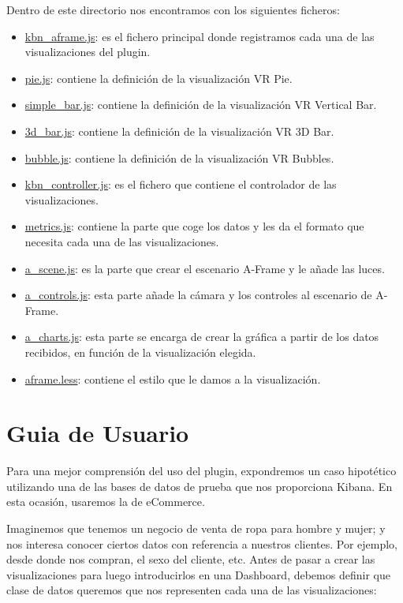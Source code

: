 \documentclass[a4paper, 12pt]{book}
\begin{document}
Dentro de este directorio nos encontramos con los siguientes ficheros:

\begin{itemize}
    \item \underline{kbn\_aframe.js}: es el fichero principal donde registramos cada una de las visualizaciones del plugin.
    \item \underline{pie.js}: contiene la definición de la visualización VR Pie.
    \item \underline{simple\_bar.js}: contiene la definición de la visualización VR Vertical Bar.
    \item \underline{3d\_bar.js}: contiene la definición de la visualización VR 3D Bar.
    \item \underline{bubble.js}: contiene la definición de la visualización VR Bubbles.
    \item \underline{kbn\_controller.js}: es el fichero que contiene el controlador de las visualizaciones.
    \item \underline{metrics.js}: contiene la parte que coge los datos y les da el formato que necesita cada una de las visualizaciones.
    \item \underline{a\_scene.js}: es la parte que crear el escenario A-Frame y le añade las luces.
    \item \underline{a\_controls.js}: esta parte añade la cámara y los controles al escenario de A-Frame.
    \item \underline{a\_charts.js}: esta parte se encarga de crear la gráfica a partir de los datos recibidos, en función de la visualización elegida.
    \item \underline{aframe.less}: contiene el estilo que le damos a la visualización.
\end{itemize}

\section{Guia de Usuario}
\label{sec:guiausuario}

Para una mejor comprensión del uso del plugin, expondremos un caso hipotético utilizando una de las bases de datos de prueba que nos proporciona Kibana. En esta ocasión, usaremos la de eCommerce. 

Imaginemos que tenemos un negocio de venta de ropa para hombre y mujer; y nos interesa conocer ciertos datos con referencia a nuestros clientes. Por ejemplo, desde donde nos compran, el sexo del cliente, etc. Antes de pasar a crear las visualizaciones para luego introducirlos en una Dashboard, debemos definir que clase de datos queremos que nos representen cada una de las visualizaciones:
\end{document}
